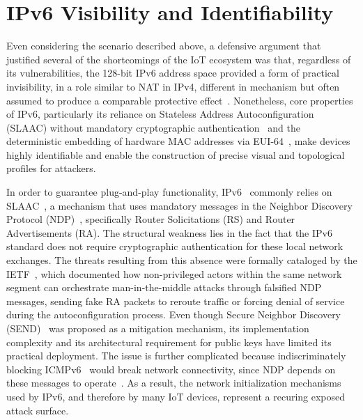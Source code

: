 \section{IPv6 Visibility and Identifiability}\label{sec:ipv6-visibility}
Even considering the scenario described above, a defensive argument that justified several of the shortcomings of the IoT ecosystem was that, regardless of its vulnerabilities, the 128-bit IPv6 address space provided a form of practical invisibility, in a role similar to NAT in IPv4, different in mechanism but often assumed to produce a comparable protective effect~\cite{williams20246sense}. Nonetheless, core properties of IPv6, particularly its reliance on Stateless Address Autoconfiguration (SLAAC) without mandatory cryptographic authentication~\cite{rfc3756} and the deterministic embedding of hardware MAC addresses via EUI-64~\cite{rye2023ipvseeyou}, make devices highly identifiable and enable the construction of precise visual and topological profiles for attackers.

In order to guarantee plug-and-play functionality, IPv6~\cite{rfc8200} commonly relies on SLAAC~\cite{rfc4862}, a mechanism that uses mandatory messages in the Neighbor Discovery Protocol (NDP)~\cite{rfc4861}, specifically Router Solicitations (RS) and Router Advertisements (RA). The structural weakness lies in the fact that the IPv6 standard does not require cryptographic authentication for these local network exchanges. The threats resulting from this absence were formally cataloged by the IETF~\cite{rfc3756}, which documented how non-privileged actors within the same network segment can orchestrate man-in-the-middle attacks through falsified NDP messages, sending fake RA packets to reroute traffic or forcing denial of service during the autoconfiguration process. Even though Secure Neighbor Discovery (SEND)~\cite{rfc3971} was proposed as a mitigation mechanism, its implementation complexity and its architectural requirement for public keys have limited its practical deployment. The issue is further complicated because indiscriminately blocking ICMPv6~\cite{rfc4443} would break network connectivity, since NDP depends on these messages to operate~\cite{rfc4890}. As a result, the network initialization mechanisms used by IPv6, and therefore by many IoT devices, represent a recuring exposed attack surface.

